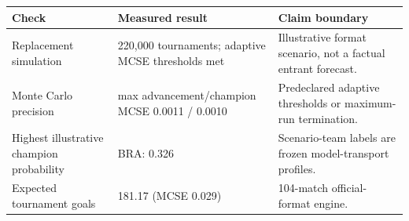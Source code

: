 \begin{tabularx}{\linewidth}{@{}lY Y@{}}
\toprule
Check & Measured result & Claim boundary \\
\midrule
Replacement simulation & 220,000 tournaments; adaptive MCSE thresholds met & Illustrative format scenario, not a factual entrant forecast. \\
Monte Carlo precision & max advancement/champion MCSE 0.0011 / 0.0010 & Predeclared adaptive thresholds or maximum-run termination. \\
Highest illustrative champion probability & BRA: 0.326 & Scenario-team labels are frozen model-transport profiles. \\
Expected tournament goals & 181.17 (MCSE 0.029) & 104-match official-format engine. \\
\bottomrule
\end{tabularx}
